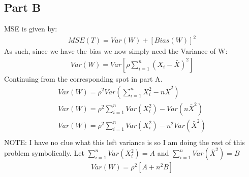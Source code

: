 \documentclass{article}
\begin{document}
\subsection*{Part B}
MSE is given by:
\begin{align*}
MSE(T) = Var(W) + [Bias(W)]^2
\end{align*}
As such, since we have the bias we now simply need the Variance of W:
\begin{align*}
Var(W) = Var[ \rho \sum_{i=1}^{n} (X_i-\bar{X})^2 ]
\end{align*}
Continuing from the corresponding spot in part A.
\begin{align*}
Var(W) = \rho^2 Var(\sum_{i=1}^{n} X_i^2 - n\bar{X}^2 )\\
Var(W) = \rho^2 \sum_{i=1}^{n} Var(X_i^2) - Var(n\bar{X}^2) \\
Var(W) = \rho^2 \sum_{i=1}^{n} Var(X_i^2) - n^2 Var(\bar{X}^2) \\
\end{align*}
NOTE: I have no clue what this left variance is so I am doing the rest of this problem symbolically. Let $\sum_{i=1}^{n} Var(X_i^2)=A$ and $\sum_{i=1}^{n}Var(\bar{X}^2)=B$
\begin{align*}
\boxed{ Var(W) = \rho^2 [A+ n^2 B] }
\end{align*}
\end{document}
